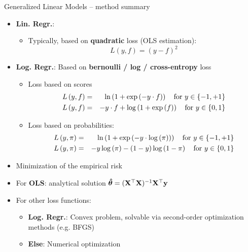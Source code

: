 \begin{vbframe}{Generalized Linear Models -- method summary}

\begin{itemize}
  \item \textbf{Lin. Regr.}:
  \begin{itemize}
    
    \item Typically, based on \textbf{quadratic} loss (OLS estimation): 
    $$L\left(y, f\right) = \left(y - f \right)^2$$ %
  \end{itemize}
  \item \textbf{Log. Regr.}: Based on \textbf{bernoulli / log / cross-entropy} loss ~ 
  \begin{itemize}
      \item Loss based on scores
      \begin{eqnarray*}
    L\left(y, f\right) &=& \ln\left(1+\exp\left(-y \cdot f\right)\right) \quad \text{for } y \in \{-1, +1\}\\
    L\left(y, f\right) &=& - y \cdot f + \log\left(1 + \exp\left(f\right)\right) \quad \text{for } y \in \{0, 1\} 
    \end{eqnarray*}
    \item Loss based on probabilities:
      \begin{eqnarray*}
    L\left(y, \pi\right) &=& \ln\left(1+\exp\left(-y \cdot \log \left(\pi\right)\right)\right) \quad \text{for } y \in \{-1, +1\}\\
    L\left(y, \pi\right) &=& -y \log \left(\pi\right) - (1 - y) \log \left(1 - \pi \right)  \quad \text{for } y \in \{0, 1\} 
    \end{eqnarray*}
  \end{itemize}
\end{itemize}

\framebreak

\medskip


\begin{itemize}
    \item Minimization of the empirical risk
    \item For \textbf{OLS}: analytical solution $\bm{\hat\theta} = (\mathbf{X}^\top \mathbf{X})^{-1} \mathbf{X}^\top \mathbf{y}$
    \item For other loss functions: 
    \begin{itemize}
        \item \textbf{Log. Regr.}: Convex problem, solvable via second-order optimization methods (e.g. BFGS)
        \item \textbf{Else}: Numerical optimization 
    \end{itemize}
    

\end{itemize}
\end{vbframe}
